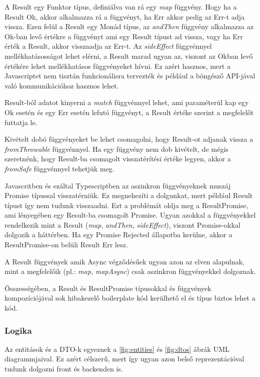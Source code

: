 A Result egy Funktor típus, definiálva van rá egy \textit{map} függvény. Hogy ha a Result Ok, akkor alkalmazza rá a függvényt, ha Err akkor pedig az Err-t adja vissza. Ezen felül a Result egy Monád típus, az \textit{andThen} függvény alkalmazza az Ok-ban levő értékre a függvényt ami egy Result típust ad vissza, vagy ha Err érték a Result, akkor visszaadja az Err-t. Az \textit{sideEffect} függvénnyel mellékhatásosságot lehet elérni, a Result marad ugyan az, viszont az Okban levő értékére lehet mellékhatásos függvényeket hívni. Ez azért hasznos, mert a Javascriptet nem tisztán funkcionálisra tervezték és például a böngésző API-jával való kommunikációhoz hasznos lehet.

Result-ból adatot kinyerni a \textit{match} függvénnyel lehet, ami paraméterül kap egy Ok esetén és egy Err esetén lefutó függvényt, a Result értéke szerint a megfelelőt futtatja le.

Kivételt dobó függvényeket be lehet csomagolni, hogy Result-ot adjanak vissza a \textit{fromThrowable} függvénnyel. Ha egy függvény nem dob kivételt, de mégis szeretnénk, hogy Result-ba csomagolt visszatérítési értéke legyen, akkor a \textit{fromSafe} függvénnyel tehetjük meg.

Javascritben és ezáltal Typescriptben az aszinkron függvényeknek muszáj Promise típussal visszatérniük. Ez megnehezíti a dolgunkat, mert például Result típust így nem tudunk visszaadni. Ezt a problémát oldja meg a ResultPromise, ami lényegében egy Result-ba csomagolt Promise. Ugyan azokkal a függvényekkel rendelkezik mint a Result (\textit{map}, \textit{andThen}, \textit{sideEffect}), viszont Promise-okkal dolgozik a háttérben. Ha egy Promise Rejected állapotba kerülne, akkor a ResultPromise-on belüli Result Err lesz.

A Result függvények amik Async végződésűek ugyan azon az elven alapulnak, mint a megfelelőik (pl.: \textit{map}, \textit{mapAsync}) csak aszinkron függvényekkel dolgoznak.

Összességében, a Result és ResultPromise típusokkal és függvények kompozíciójával sok hibakezelő boilerplate kód kerülhető el és típus biztos lehet a kód.

\subsubsection{Logika}

Az entitások és a DTO-k egyeznek a \ref{fig:entities} és \ref{fig:dtos} ábrák UML diagrammjaival. Ez azért célszerű, mert így ugyan azon belső reprezentációval tudunk dolgozni front és backenden is.

